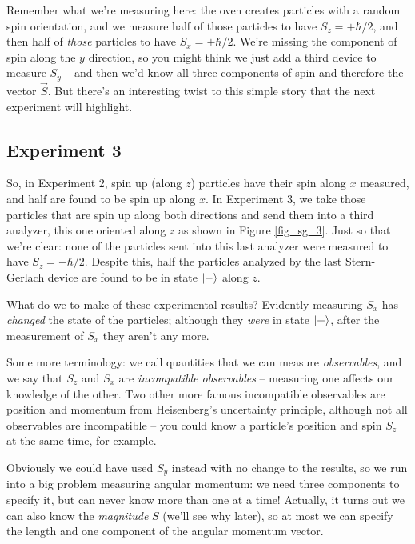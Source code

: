 Remember what we're measuring here:  the oven creates particles with a random spin orientation, and we measure half of those particles to have $S_z = +\hbar/2$, and then half of \emph{those} particles to have $S_x = +\hbar/2$.  We're missing the component of spin along the $y$ direction, so you might think we just add a third device to measure $S_y$ -- and then we'd know all three components of spin and therefore the vector $\vec{S}$.  But there's an interesting twist to this simple story that the next experiment will highlight.

\subsection{Experiment 3}
\label{sec_exp3}

So, in Experiment 2, spin up (along $z$) particles have their spin along $x$ measured, and half are found to be spin up along $x$.  In Experiment 3, we take those particles that are spin up along both directions and send them into a third analyzer, this one oriented along $z$ as shown in Figure \ref{fig_sg_3}.  Just so that we're clear:  none of the particles sent into this last analyzer were measured to have $S_z = -\hbar/2$.  Despite this, half the particles analyzed by the last Stern-Gerlach device are found to be in state $| - \rangle$ along $z$.

What do we to make of these experimental results?  Evidently measuring $S_x$ has \emph{changed} the state of the particles; although they \emph{were} in state $| + \rangle$, after the measurement of $S_x$ they aren't any more.  

Some more terminology:  we call quantities that we can measure \emph{observables}, and we say that $S_z$ and $S_x$ are \emph{incompatible observables} -- measuring one affects our knowledge of the other.  Two other more famous incompatible observables are position and momentum from Heisenberg's uncertainty principle, although not all observables are incompatible -- you could know a particle's position and spin $S_z$ at the same time, for example.  

Obviously we could have used $S_y$ instead with no change to the results, so we run into a big problem measuring angular momentum:  we need three components to specify it, but can never know more than one at a time!  Actually, it turns out we can also know the \emph{magnitude} $S$ (we'll see why later), so at most we can specify the length and one component of the angular momentum vector.

